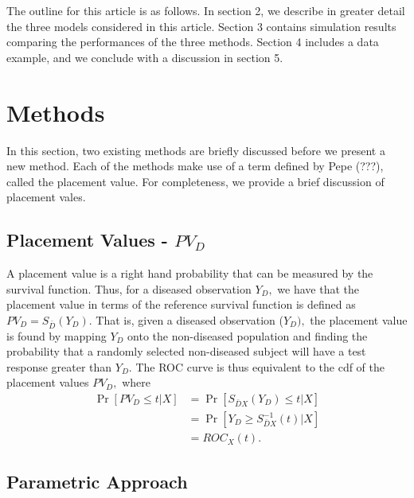 \documentclass{interact}
\theoremstyle{definition}
\begin{document}
The outline for this article is as follows.  In section 2, we describe in greater detail the three models considered in this article. 
Section 3 contains simulation results comparing the performances of the three methods.  Section 4 includes a data example, and we conclude with a discussion in section 5.  \\

\section{Methods}
In this section, two existing methods are briefly discussed before we present a new method. Each of the methods make use of a term defined by Pepe (???), called the placement value.  For completeness, we provide a brief discussion of placement vales.
\subsection{Placement Values - $PV_D$}
  A placement value is a right hand probability that can be measured by the survival function.  Thus, for a diseased observation $Y_D,$ we have that the placement value in terms of the reference survival function is defined as $ PV_D = S_{\bar{D}}(Y_D). $  That is, given a diseased observation ($Y_D),$ the placement value is found by mapping $Y_D$ onto the non-diseased population and finding the probability that a randomly selected non-diseased subject will have a test response greater than $Y_D.$  The ROC curve is thus equivalent to the cdf of the  placement values $PV_D,$ where 
\begin{align*}
		\Pr[PV_D \leq t | X] &= \Pr[S_{\bar{D}X}(Y_D) \leq t |X] \\
		&=  \Pr[Y_D \geq S_{\bar{D}X}^{-1}(t) | X]\\
		&= ROC_{X}(t).
		\end{align*}  

\subsection{Parametric Approach}
\end{document}
